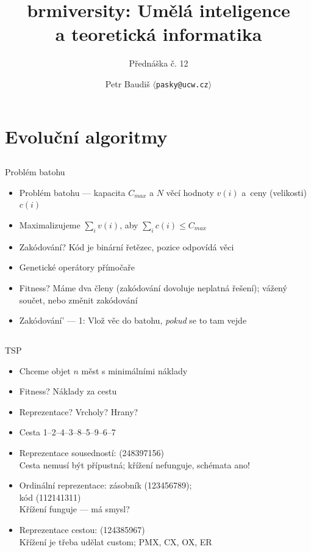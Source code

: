 \documentclass{beamer}
\begin{document}

\title{brmiversity: Umělá inteligence \\ a teoretická informatika}
\subtitle{Přednáška č. 12}
\author{Petr Baudiš $\langle${\tt pasky@ucw.cz}$\rangle$}
\date{}
\frame{\titlepage}

\section{Evoluční algoritmy}

\subsection{}
\begin{frame}{Problém batohu}
\begin{itemize}
\item Problém batohu --- kapacita $C_{max}$ a $N$ věcí hodnoty $v(i)$ a~ceny (velikosti) $c(i)$
\item Maximalizujeme $\sum_i v(i)$, aby $\sum_i c(i) \le C_{max}$
\item Zakódování? \pause Kód je binární řetězec, pozice odpovídá věci
\item Genetické operátory přímočaře
\item Fitness? \pause Máme dva členy (zakódování dovoluje neplatná řešení); vážený součet, nebo změnit zakódování
\pause
\item Zakódování' --- 1: Vlož věc do batohu, {\em pokud} se to tam vejde
\end{itemize}
\end{frame}

\subsection{}
\begin{frame}{TSP}
\begin{itemize}
\item Chceme objet $n$ měst s minimálními náklady
\item Fitness? \pause Náklady za cestu
\item Reprezentace? \pause Vrcholy? Hrany? \pause
\item Cesta 1--2--4--3--8--5--9--6--7
\item Reprezentace sousedností: (248397156) \\
	Cesta nemusí být přípustná; křížení nefunguje, schémata ano!
\item Ordinální reprezentace: zásobník (123456789); \\ kód (112141311) \\
	Křížení funguje --- má smysl?
\item Reprezentace cestou: (124385967) \\
	Křížení je třeba udělat custom; PMX, CX, OX, ER
\end{itemize}
\end{frame}
\end{document}
